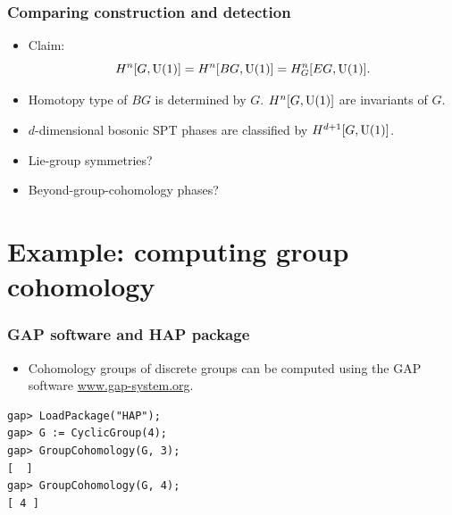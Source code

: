 \documentclass[xcolor=table, aspectratio=169,ignorenonframetext]{beamer}
\newcommand{\uone}{\text U(1)}
\begin{document}
\begin{frame}
	\frametitle{Comparing construction and detection}
	\begin{itemize}
		\item Claim:
		\[H^n[G, \uone] = H^n[BG, \uone] = H^n_G[EG, \uone].\]
		\item Homotopy type of $BG$ is determined by $G$. $H^n[G, \uone]$ are invariants of $G$.
		\item $d$-dimensional bosonic SPT phases are classified by
		$H^{d+1}[G, \uone]$.
		\item Lie-group symmetries?
		\item Beyond-group-cohomology phases?
	\end{itemize}
\end{frame}

\section{Example: computing group cohomology}

\begin{frame}[fragile]
	\frametitle{GAP software and HAP package}
	\begin{itemize}
		\item Cohomology groups of discrete groups can be computed using the GAP software \url{www.gap-system.org}.
	\end{itemize}
	\begin{verbatim}
gap> LoadPackage("HAP");
gap> G := CyclicGroup(4);
gap> GroupCohomology(G, 3);
[  ]
gap> GroupCohomology(G, 4);
[ 4 ]
	\end{verbatim}
\end{frame}
\end{document}
